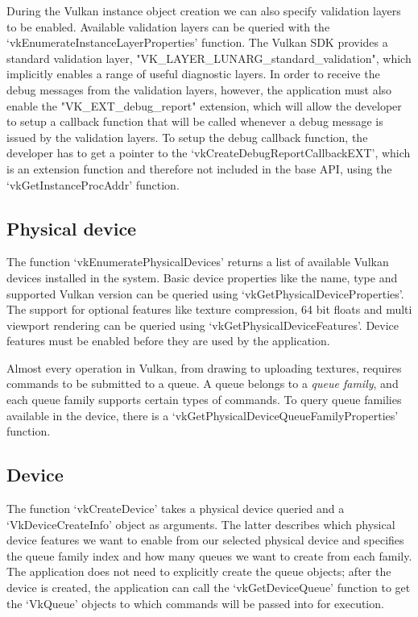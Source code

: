 During the Vulkan instance object creation we can also specify validation layers to be enabled. Available validation layers can be queried with the `vkEnumerateInstanceLayerProperties' function. The Vulkan SDK provides a standard validation layer, "VK\_LAYER\_LUNARG\_standard\_validation", which implicitly enables a range of useful diagnostic layers. In order to receive the debug messages from the validation layers, however, the application must also enable the "VK\_EXT\_debug\_report" extension, which will allow the developer to setup a callback function that will be called whenever a debug message is issued by the validation layers. To setup the debug callback function, the developer has to get a pointer to the `vkCreateDebugReportCallbackEXT', which is an extension function and therefore not included in the base API, using the `vkGetInstanceProcAddr' function.

\subsection{Physical device}
The function `vkEnumeratePhysicalDevices' returns a list of available Vulkan devices installed in the system. Basic device properties like the name, type and supported Vulkan version can be queried using `vkGetPhysicalDeviceProperties'. The support for optional features like texture compression, 64 bit floats and multi viewport rendering can be queried using `vkGetPhysicalDeviceFeatures'. Device features must be enabled before they are used by the application.

Almost every operation in Vulkan, from drawing to uploading textures, requires commands to be submitted to a queue. A queue belongs to a \emph{queue family}, and each queue family supports certain types of commands. To query queue families available in the device, there is a `vkGetPhysicalDeviceQueueFamilyProperties' function.

\subsection{Device}
The function `vkCreateDevice' takes a physical device queried and a `VkDeviceCreateInfo' object as arguments. The latter describes which physical device features we want to enable from our selected physical device and specifies the queue family index and how many queues we want to create from each family. The application does not need to explicitly create the queue objects; after the device is created, the application can call the `vkGetDeviceQueue' function to get the `VkQueue' objects to which commands will be passed into for execution.


